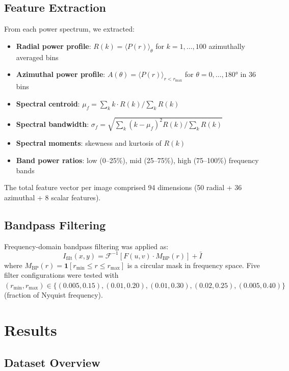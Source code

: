 \documentclass[11pt,a4paper]{article}
\begin{document}
\subsection{Feature Extraction}

From each power spectrum, we extracted:
\begin{itemize}
    \item \textbf{Radial power profile}: $R(k) = \langle P(r) \rangle_{\theta}$
          for $k = 1,\ldots,100$ azimuthally averaged bins
    \item \textbf{Azimuthal power profile}: $A(\theta) = \langle P(r) \rangle_{r<r_{\max}}$
          for $\theta = 0,\ldots,180°$ in 36 bins
    \item \textbf{Spectral centroid}: $\mu_f = \sum_k k \cdot R(k) / \sum_k R(k)$
    \item \textbf{Spectral bandwidth}: $\sigma_f = \sqrt{\sum_k (k-\mu_f)^2 R(k) / \sum_k R(k)}$
    \item \textbf{Spectral moments}: skewness and kurtosis of $R(k)$
    \item \textbf{Band power ratios}: low (0--25\%), mid (25--75\%), high (75--100\%)
          frequency bands
\end{itemize}

The total feature vector per image comprised 94 dimensions (50 radial + 36 azimuthal
+ 8 scalar features).

\subsection{Bandpass Filtering}

Frequency-domain bandpass filtering was applied as:
\begin{equation}
    I_{\text{filt}}(x,y) = \mathcal{F}^{-1}\left[
    F(u,v) \cdot M_{\text{BP}}(r)\right] + \bar{I}
\end{equation}
where $M_{\text{BP}}(r) = \mathbf{1}[r_{\min} \leq r \leq r_{\max}]$ is a circular
mask in frequency space. Five filter configurations were tested with
$(r_{\min}, r_{\max}) \in \{(0.005, 0.15), (0.01, 0.20), (0.01, 0.30),
(0.02, 0.25), (0.005, 0.40)\}$ (fraction of Nyquist frequency).

\section{Results}

\subsection{Dataset Overview}
\end{document}

